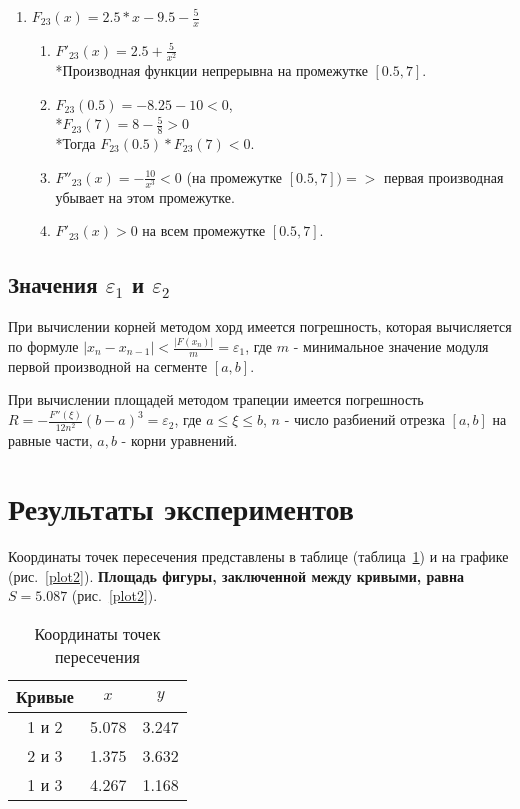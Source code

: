 \documentclass[a4paper,12pt,titlepage,finall]{article}
\begin{document}
\begin{enumerate}
    \item $F_{23}(x) = 2.5*x - 9.5 - \frac{5}{x}$
    \begin{enumerate}
        \item $F'_{23}(x) = 2.5 + \frac{5}{x^2}$
        \\*Производная функции непрерывна на промежутке $[0.5, 7]$.
        \item $F_{23}(0.5) = -8.25 - 10 < 0$,
        \\*$F_{23}(7) = 8 - \frac{5}{8} > 0$
        \\*Тогда $F_{23}(0.5) * F_{23}(7) < 0$.
        \item $F''_{23}(x) = -\frac{10}{x^3} < 0$ (на промежутке $[0.5, 7]) =>$ первая производная убывает на этом промежутке.
        \item $F'_{23}(x) > 0$ на всем промежутке $[0.5, 7]$.
    \end{enumerate}
    
\end{enumerate}

\subsection{Значения $\varepsilon_1$ и $\varepsilon_2$}

При вычислении корней методом хорд имеется погрешность, которая вычисляется по формуле $|x_n-x_{n-1}|<\frac{|F(x_n)|}{m}=\varepsilon_1$, где $m$ - минимальное значение модуля первой производной на сегменте $[a, b]$.~\cite{math}

При вычислении площадей методом трапеции имеется погрешность $R=-\frac{F''(\xi)}{12n^2}(b-a)^3=\varepsilon_2$, где $a\leq\xi\leq b$, $n$ - число разбиений отрезка $[a, b]$ на равные части, $a, b$ - корни уравнений.~\cite{math}

\newpage

\section{Результаты экспериментов}

Координаты точек пересечения представлены в таблице (таблица~\ref{table1}) и на графике (рис.~\ref{plot2}). 
\textbf{Площадь фигуры, заключенной между кривыми, равна $S = 5.087$} (рис.~\ref{plot2}).

\begin{table}[h]
\centering
\begin{tabular}{|c|c|c|}
\hline
Кривые & $x$ & $y$ \\
\hline
1 и 2 & 5.078 & 3.247 \\
2 и 3 & 1.375 & 3.632 \\
1 и 3 & 4.267 & 1.168 \\
\hline
\end{tabular}
\caption{Координаты точек пересечения}
\label{table1}
\end{table}
\end{document}
